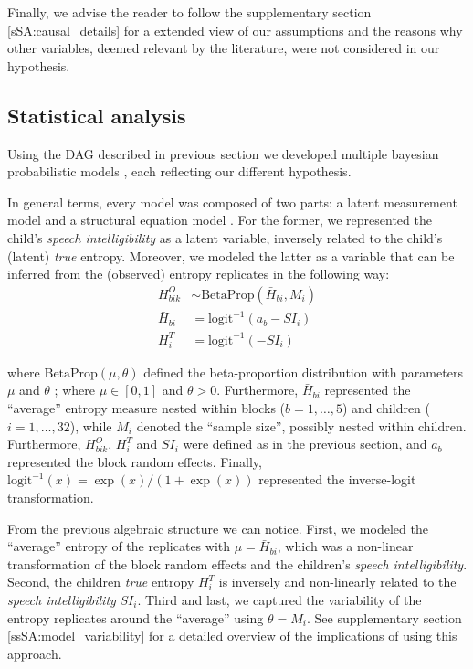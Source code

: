 Finally, we advise the reader to follow the supplementary section \ref{sSA:causal_details} for a extended view of our assumptions and the reasons why other variables, deemed relevant by the literature, were not considered in our hypothesis.
%
%
\subsection{Statistical analysis} \label{sS:stat_analysis}
%
Using the DAG described in previous section we developed multiple bayesian probabilistic models \cite{Jaynes_2003}, each reflecting our different hypothesis.

In general terms, every model was composed of two parts: a latent measurement model \cite{Everitt_1984} and a structural equation model \cite{Hoyle_et_al_2014}. For the former, we represented the child's \textit{speech intelligibility} as a latent variable, inversely related to the child's (latent) \textit{true} entropy. Moreover, we modeled the latter as a variable that can be inferred from the (observed) entropy replicates in the following way:
%
\begin{align}
	H^{O}_{bik} & \sim \text{BetaProp} \left( \bar{H}_{bi}, M_{i} \right) \\ 
	\bar{H}_{bi} &= \text{logit}^{-1}( a_{b} -SI_{i} ) \\
	H^{T}_{i} &= \text{logit}^{-1}( -SI_{i} )
\end{align} 

\noindent where $\text{BetaProp}(\mu, \theta)$ defined the beta-proportion distribution with parameters $\mu$ and $\theta$ \cite{Figueroa-Zuniga_et_al_2013, Kruschke_2015}; where $\mu \in [0,1]$ and $\theta>0$. Furthermore, $\bar{H}_{bi}$ represented the ``average'' entropy measure nested within blocks ($b=1,\dots,5$) and children ($i=1,\dots,32$), while $M_{i}$ denoted the ``sample size'', possibly nested within children. Furthermore, $H^{O}_{bik}$, $H^{T}_{i}$ and $SI_{i}$ were defined as in the previous section, and $a_{b}$ represented the block random effects. Finally, $\text{logit}^{-1}(x) = \exp(x) / ( 1 + \exp(x) )$ represented the inverse-logit transformation. 

From the previous algebraic structure we can notice. First, we modeled the ``average'' entropy of the replicates with $\mu = \bar{H}_{bi}$, which was a non-linear transformation of the block random effects and the children's \textit{speech intelligibility}. Second, the children \textit{true} entropy $H^{T}_{i}$ is inversely and non-linearly related to the \textit{speech intelligibility} $SI_{i}$. Third and last, we captured the variability of the entropy replicates around the ``average'' using $\theta = M_{i}$. See supplementary section \ref{ssSA:model_variability} for a detailed overview of the implications of using this approach.

